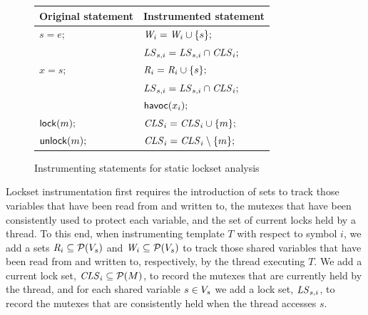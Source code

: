 \begin{figure}
\begin{tabular}{ll}
\textbf{Original statement} & \textbf{Instrumented statement} \\\hline
$s = e;$ & $\mathit{W}_{i} = \mathit{W}_{i} \cup \{ s \};$ \\
         & $\mathit{LS}_{s,i} = \mathit{LS}_{s,i} \cap \mathit{CLS}_{i};$ \\\hline
$x = s;$ & $\mathit{R}_{i} = \mathit{R}_{i} \cup \{ s \};$ \\
         & $\mathit{LS}_{s,i} = \mathit{LS}_{s,i} \cap \mathit{CLS}_{i};$ \\
         & $\mathsf{havoc}({x_{i}});$ \\\hline
$\mathsf{lock}(m);$   & $\mathit{CLS}_{i} = \mathit{CLS}_{i} \cup \{ m \};$ \\\hline
$\mathsf{unlock}(m);$ & $\mathit{CLS}_{i} = \mathit{CLS}_{i} \setminus \{ m \};$ \\\hline
\end{tabular}
\caption{Instrumenting statements for static lockset analysis}\label{fig:instrumentation}
\end{figure}

Lockset instrumentation first requires the introduction of sets to track those variables that have been read from and written to, the mutexes that have been consistently used to protect each variable, and the set of current locks held by a thread.  To this end, when instrumenting template $T$ with respect to symbol $i$, we add a sets $\mathit{R}_{i} \subseteq \mathcal{P}(V_s)$ and $\mathit{W}_{i} \subseteq \mathcal{P}(V_s)$ to track those shared variables that have been read from and written to, respectively, by the thread executing $T$.  We add a current lock set, $\mathit{CLS}_{i} \subseteq \mathcal{P}(M)$, to record the mutexes that are currently held by the thread, and for each shared variable $s \in V_s$ we add a lock set, $\mathit{LS}_{s,i}$, to record the mutexes that are consistently held when the thread accesses $s$.

